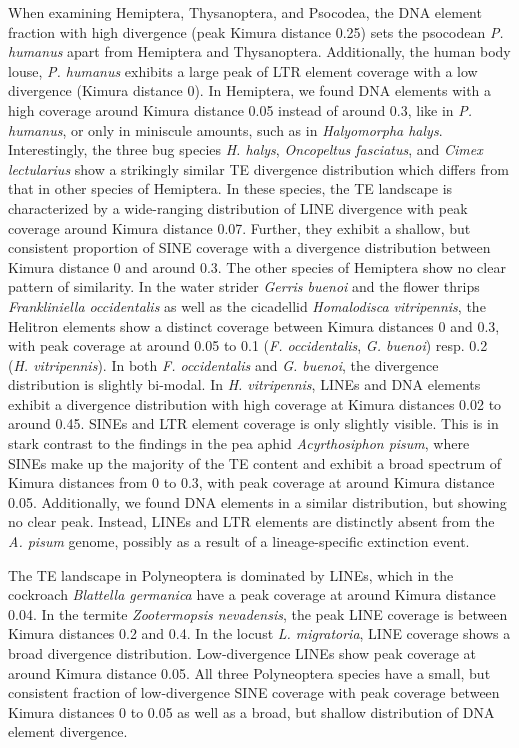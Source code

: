 When examining Hemiptera, Thysanoptera, and Psocodea, the DNA element
fraction with high divergence (peak Kimura distance 0.25) sets the
psocodean \emph{P. humanus} apart from Hemiptera and Thysanoptera.
Additionally, the human body louse, \emph{P. humanus} exhibits a large
peak of LTR element coverage with a low divergence (Kimura distance 0).
In Hemiptera, we found DNA elements with a high coverage around Kimura
distance 0.05 instead of around 0.3, like in \emph{P. humanus}, or only
in miniscule amounts, such as in \emph{Halyomorpha halys}.
Interestingly, the three bug species \emph{H. halys}, \emph{Oncopeltus
fasciatus}, and \emph{Cimex lectularius} show a strikingly similar TE
divergence distribution which differs from that in other species of
Hemiptera. In these species, the TE landscape is characterized by a
wide-ranging distribution of LINE divergence with peak coverage around
Kimura distance 0.07. Further, they exhibit a shallow, but consistent
proportion of SINE coverage with a divergence distribution between
Kimura distance 0 and around 0.3. The other species of Hemiptera show no
clear pattern of similarity. In the water strider \emph{Gerris buenoi}
and the flower thrips \emph{Frankliniella occidentalis} as well as the
cicadellid \emph{Homalodisca vitripennis}, the Helitron elements show a
distinct coverage between Kimura distances 0 and 0.3, with peak coverage
at around 0.05 to 0.1 (\emph{F. occidentalis}, \emph{G. buenoi}) resp.
0.2 (\emph{H. vitripennis}). In both \emph{F. occidentalis} and \emph{G.
buenoi}, the divergence distribution is slightly bi-modal. In \emph{H.
vitripennis}, LINEs and DNA elements exhibit a divergence distribution
with high coverage at Kimura distances 0.02 to around 0.45. SINEs and
LTR element coverage is only slightly visible. This is in stark contrast
to the findings in the pea aphid \emph{Acyrthosiphon pisum}, where SINEs
make up the majority of the TE content and exhibit a broad spectrum of
Kimura distances from 0 to 0.3, with peak coverage at around Kimura
distance 0.05. Additionally, we found DNA elements in a similar
distribution, but showing no clear peak. Instead, LINEs and LTR elements
are distinctly absent from the \emph{A. pisum} genome, possibly as a
result of a lineage-specific extinction event.

The TE landscape in Polyneoptera is dominated by LINEs, which in the
cockroach \emph{Blattella germanica} have a peak coverage at around
Kimura distance 0.04. In the termite \emph{Zootermopsis nevadensis}, the
peak LINE coverage is between Kimura distances 0.2 and 0.4. In the
locust \emph{L. migratoria}, LINE coverage shows a broad divergence
distribution. Low-divergence LINEs show peak coverage at around Kimura
distance 0.05. All three Polyneoptera species have a small, but
consistent fraction of low-divergence SINE coverage with peak coverage
between Kimura distances 0 to 0.05 as well as a broad, but shallow
distribution of DNA element divergence.



